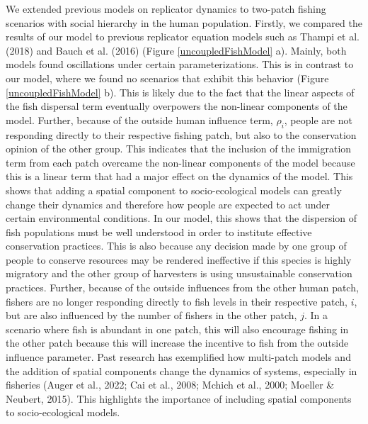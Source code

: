 \documentclass[
]{article}
\begin{document}
We extended previous models on replicator dynamics to two-patch fishing scenarios with social hierarchy in the human population. Firstly, we compared the results of our model to previous replicator equation models such as Thampi et al. (2018) and Bauch et al. (2016) (Figure \ref{uncoupledFishModel} a). Mainly, both models found oscillations under certain parameterizations. This is in contrast to our model, where we found no scenarios that exhibit this behavior (Figure \ref{uncoupledFishModel} b). This is likely due to the fact that the linear aspects of the fish dispersal term eventually overpowers the non-linear components of the model. Further, because of the outside human influence term, \(\rho_i\), people are not responding directly to their respective fishing patch, but also to the conservation opinion of the other group. This indicates that the inclusion of the immigration term from each patch overcame the non-linear components of the model because this is a linear term that had a major effect on the dynamics of the model. This shows that adding a spatial component to socio-ecological models can greatly change their dynamics and therefore how people are expected to act under certain environmental conditions. In our model, this shows that the dispersion of fish populations must be well understood in order to institute effective conservation practices. This is also because any decision made by one group of people to conserve resources may be rendered ineffective if this species is highly migratory and the other group of harvesters is using unsustainable conservation practices. Further, because of the outside influences from the other human patch, fishers are no longer responding directly to fish levels in their respective patch, \(i\), but are also influenced by the number of fishers in the other patch, \(j\). In a scenario where fish is abundant in one patch, this will also encourage fishing in the other patch because this will increase the incentive to fish from the outside influence parameter. Past research has exemplified how multi-patch models and the addition of spatial components change the dynamics of systems, especially in fisheries (Auger et al., 2022; Cai et al., 2008; Mchich et al., 2000; Moeller \& Neubert, 2015). This highlights the importance of including spatial components to socio-ecological models.
\end{document}
